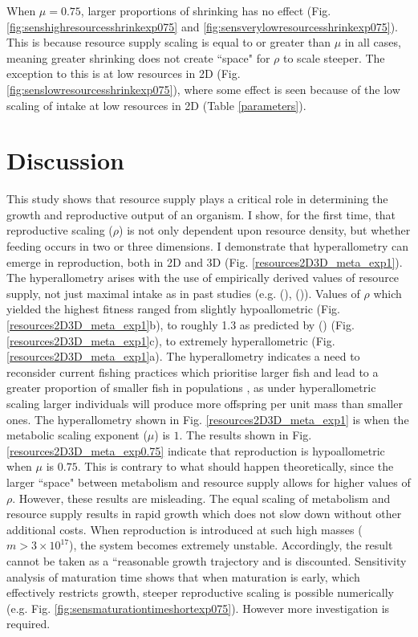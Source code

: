 \documentclass[a4paper, 11pt, hidelinks]{article} %
\newcommand{\authorcite}[1]{\citeauthor{#1} (\citeyear{#1})}
\begin{document}
	When $ \mu = 0.75 $, larger proportions of shrinking has no effect (Fig. \ref{fig:senshighresourcesshrinkexp075} and \ref{fig:sensverylowresourcesshrinkexp075}).  This is because resource supply scaling is equal to or greater than $ \mu $ in all cases, meaning greater shrinking does not create ``space" for $ \rho $ to scale steeper.  The exception to this is at low resources in 2D (Fig. \ref{fig:senslowresourcesshrinkexp075}), where some effect is seen because of the low scaling of intake at low resources in 2D (Table \ref{parameters}).

	
\section{Discussion}
	This study shows that resource supply plays a critical role in determining the growth and reproductive output of an organism.  I show, for the first time, that reproductive scaling ($ \rho $) is not only dependent upon resource density, but whether feeding occurs in two or three dimensions.  
	I demonstrate that hyperallometry can emerge in reproduction, both in 2D and 3D (Fig. \ref{resources2D3D_meta_exp1}).  The hyperallometry arises with the use of empirically derived values of resource supply, not just maximal intake as in past studies (e.g. \authorcite{West2001}, \authorcite{Hou2008}).  Values of $ \rho $ which yielded the highest fitness ranged from slightly hypoallometric (Fig. \ref{resources2D3D_meta_exp1}b), to roughly 1.3 as predicted by \citeauthor{Barneche2018} (\citeyear{Barneche2018}) (Fig. \ref{resources2D3D_meta_exp1}c), to extremely hyperallometric (Fig. \ref{resources2D3D_meta_exp1}a).  The hyperallometry indicates a need to reconsider current fishing practices which prioritise larger fish and lead to a greater proportion of smaller fish in populations \parencite{Heino2013}, as under hyperallometric scaling larger individuals will produce more offspring per unit mass than smaller ones.  The hyperallometry shown in Fig. \ref{resources2D3D_meta_exp1} is when the metabolic scaling exponent ($ \mu $) is $ 1 $.
	The results shown in Fig. \ref{resources2D3D_meta_exp0.75} indicate that reproduction is hypoallometric when $ \mu $ is $ 0.75 $.  This is contrary to what should happen theoretically, since the larger ``space" between metabolism and resource supply allows for higher values of $ \rho $. However, these results are misleading.  The equal scaling of metabolism and resource supply results in rapid growth which does not slow down without other additional costs.  When reproduction is introduced at such high masses ($ m > 3\times 10^{17} $), the system becomes extremely unstable.  Accordingly, the result cannot be taken as a ``reasonable growth trajectory and is discounted.  Sensitivity analysis of maturation time shows that when maturation is early, which effectively restricts growth, steeper reproductive scaling is possible numerically (e.g. Fig. \ref{fig:sensmaturationtimeshortexp075}).  However more investigation is required.
\end{document}
